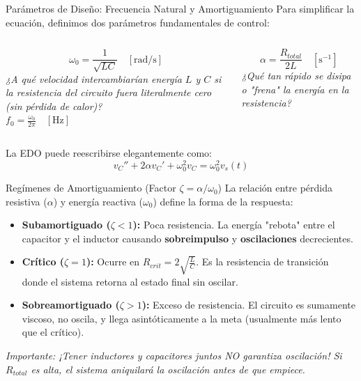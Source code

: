 \documentclass[aspectratio=169, 10pt]{beamer}
\begin{document}
\begin{frame}{Parámetros de Diseño: Frecuencia Natural y Amortiguamiento}
    Para simplificar la ecuación, definimos dos parámetros fundamentales de control:
    
    \begin{columns}[T]
        \begin{tcolorbox}[colback=white, colframe=black, title=\textbf{Frecuencia Natural no Amortiguada}]
            $$\omega_0 = \frac{1}{\sqrt{LC}} \quad [\text{rad/s}]$$
            \textit{¿A qué velocidad intercambiarían energía $L$ y $C$ si la resistencia del circuito fuera literalmente cero (sin pérdida de calor)?} \\
            $f_0 = \frac{\omega_0}{2\pi} \quad [\text{Hz}]$
        \end{tcolorbox}
        
        \begin{tcolorbox}[colback=white, colframe=black, title=\textbf{Factor de Amortiguamiento}]
            $$\alpha = \frac{R_{total}}{2L} \quad [\text{s}^{-1}]$$
            \textit{¿Qué tan rápido se disipa o "frena" la energía en la resistencia?}
        \end{tcolorbox}
    \end{columns}
    
    \vspace{0.4cm}
    La EDO puede reescribirse elegantemente como:
    $$v_C'' + 2\alpha v_C' + \omega_0^2 v_C = \omega_0^2 v_s(t)$$
\end{frame}

\begin{frame}{Regímenes de Amortiguamiento (Factor $\zeta = \alpha / \omega_0$)}
    La relación entre pérdida resistiva ($\alpha$) y energía reactiva ($\omega_0$) define la forma de la respuesta:
    
    \vspace{0.2cm}
    \begin{itemize}
        \item \textbf{Subamortiguado ($\zeta < 1$):} Poca resistencia. La energía "rebota" entre el capacitor y el inductor causando \textbf{sobreimpulso} y \textbf{oscilaciones} decrecientes. 
        \item \textbf{Crítico ($\zeta = 1$):} Ocurre en $R_{crit} = 2\sqrt{\frac{L}{C}}$. Es la resistencia de transición donde el sistema retorna al estado final sin oscilar.
        \item \textbf{Sobreamortiguado ($\zeta > 1$):} Exceso de resistencia. El circuito es sumamente viscoso, no oscila, y llega asintóticamente a la meta (usualmente más lento que el crítico).
    \end{itemize}
    
    \vspace{0.3cm}
    \textit{Importante: ¡Tener inductores y capacitores juntos NO garantiza oscilación! Si $R_{total}$ es alta, el sistema aniquilará la oscilación antes de que empiece.}
\end{frame}
\end{document}
